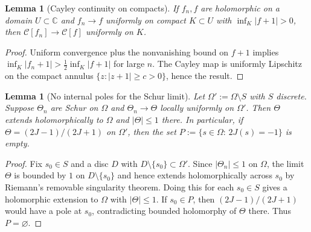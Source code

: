 \documentclass[11pt]{article}
\newtheorem{lemma}[theorem]{Lemma}
\theoremstyle{definition}
\theoremstyle{remark}
\newcommand{\C}{\mathbb{C}}
\begin{document}
\begin{lemma}[Cayley continuity on compacts]\label{lem:cayley-cont}
If \(f_n,f\) are holomorphic on a domain \(U\subset\C\) and \(f_n\to f\) uniformly on compact \(K\subset U\) with \(\inf_{K}|f+1|>0\), then \(\mathcal C[f_n]\to\mathcal C[f]\) uniformly on \(K\).
\end{lemma}
\begin{proof}
Uniform convergence plus the nonvanishing bound on \(f+1\) implies \(\inf_{K}|f_n+1|>\tfrac12\inf_{K}|f+1|\) for large \(n\). The Cayley map is uniformly Lipschitz on the compact annulus \(\{z: |z+1|\ge c>0\}\), hence the result.
\end{proof}

\begin{lemma}[No internal poles for the Schur limit]\label{lem:no-P}
Let \(\Omega':=\Omega\setminus S\) with $S$ discrete. Suppose \(\Theta_n\) are Schur on \(\Omega\) and \(\Theta_n\to\Theta\) locally uniformly on \(\Omega'\). Then \(\Theta\) extends holomorphically to \(\Omega\) and \(|\Theta|\le 1\) there. In particular, if \(\Theta=(2J-1)/(2J+1)\) on \(\Omega'\), then the set \(P:=\{s\in\Omega:\,2J(s)=-1\}\) is empty.
\end{lemma}
\begin{proof}
Fix $s_0\in S$ and a disc $D$ with $D\setminus\{s_0\}\subset\Omega'$. Since $|\Theta_n|\le 1$ on $\Omega$, the limit $\Theta$ is bounded by $1$ on $D\setminus\{s_0\}$ and hence extends holomorphically across $s_0$ by Riemann's removable singularity theorem. Doing this for each $s_0\in S$ gives a holomorphic extension to $\Omega$ with $|\Theta|\le 1$. If $s_0\in P$, then $(2J-1)/(2J+1)$ would have a pole at $s_0$, contradicting bounded holomorphy of $\Theta$ there. Thus $P=\varnothing$.
\end{proof}
\end{document}
